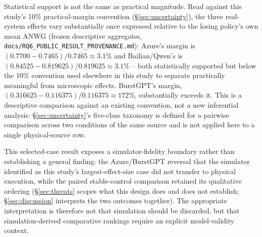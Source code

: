 Statistical support is not the same as practical magnitude. Read against
this study's 10\% practical-margin convention (\S\ref{sec:uncertainty}),
the three real-system effects vary substantially once expressed relative
to the losing policy's own mean ANWG (frozen descriptive aggregates,
\texttt{docs/RQ6\_PUBLIC\_RESULT\_PROVENANCE.md}): Azure's margin is
$(0.7700-0.7465)/0.7465 \approx 3.1\%$ and Bailian/Qwen's is
$(0.84525-0.819625)/0.819625 \approx 3.1\%$ -- both statistically
supported but below the 10\% convention used elsewhere in this study to
separate practically meaningful from microscopic effects. BurstGPT's
margin, $(0.316625-0.116375)/0.116375 \approx 172\%$, substantially
exceeds it. This is a descriptive comparison against an existing
convention, not a new inferential analysis: \S\ref{sec:uncertainty}'s
five-class taxonomy is defined for a pairwise comparison across two
conditions of the same source and is not applied here to a single
physical-source row.

This selected-case result exposes a simulator-fidelity boundary rather
than establishing a general finding: the Azure/BurstGPT reversal that the
simulator identified as this study's largest-effect-size case did not
transfer to physical execution, while the paired stable-control comparison
retained its qualitative ordering (\S\ref{sec:threats} scopes what this
design does and does not establish; \S\ref{sec:discussion} interprets the
two outcomes together). The appropriate interpretation is therefore not
that simulation should be discarded, but that simulation-derived
comparative rankings require an explicit model-validity context.
